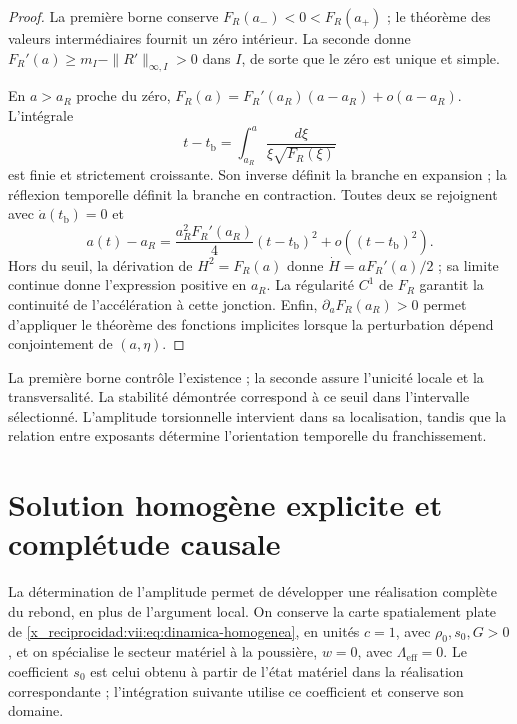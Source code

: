 \begin{proof}
La première borne conserve \(F_R(a_-)<0<F_R(a_+)\) ; le théorème des valeurs intermédiaires fournit un zéro intérieur. La seconde donne \(F_R'(a)\geq m_I-\|R'\|_{\infty,I}>0\) dans \(I\), de sorte que le zéro est unique et simple.

En \(a>a_R\) proche du zéro,
\(F_R(a)=F_R'(a_R)(a-a_R)+o(a-a_R)\).
L'intégrale
\[
 t-t_{\mathrm b}=\int_{a_R}^{a}
          \frac{d\xi}{\xi\sqrt{F_R(\xi)}}
\]
est finie et strictement croissante. Son inverse définit la branche
en expansion ; la réflexion temporelle définit la branche en contraction.
Toutes deux se rejoignent avec \(\dot a(t_{\mathrm b})=0\) et
\[
 a(t)-a_R
 =\frac{a_R^2F_R'(a_R)}4(t-t_{\mathrm b})^2
   +o((t-t_{\mathrm b})^2).
\]
Hors du seuil, la dérivation de \(H^2=F_R(a)\) donne
\(\dot H=aF_R'(a)/2\) ; sa limite continue donne l'expression positive
en \(a_R\). La régularité \(C^1\) de \(F_R\) garantit la continuité
de l'accélération à cette jonction. Enfin,
\(\partial_aF_R(a_R)>0\) permet d'appliquer le théorème des fonctions
implicites lorsque la perturbation dépend conjointement de \((a,\eta)\).
\end{proof}

La première borne contrôle l'existence ; la seconde assure l'unicité locale et la transversalité. La stabilité démontrée correspond à ce seuil dans l'intervalle sélectionné. L'amplitude torsionnelle intervient dans sa localisation, tandis que la relation entre exposants détermine l'orientation temporelle du franchissement.



\chapter{Solution homogène explicite et complétude causale}
\label{x_reciprocidad:vii:sec:solucion-homogenea}
La détermination de l'amplitude permet de développer une réalisation
complète du rebond, en plus de l'argument local. On conserve la carte
spatialement plate de \eqref{x_reciprocidad:vii:eq:dinamica-homogenea}, en unités
\(c=1\), avec \(\rho_0,s_0,G>0\), et on spécialise le secteur matériel
à la poussière, \(w=0\), avec \(\Lambda_{\mathrm{eff}}=0\).
Le coefficient \(s_0\) est celui obtenu à partir de l'état
matériel dans la réalisation correspondante ; l'intégration suivante
utilise ce coefficient et conserve son domaine.

